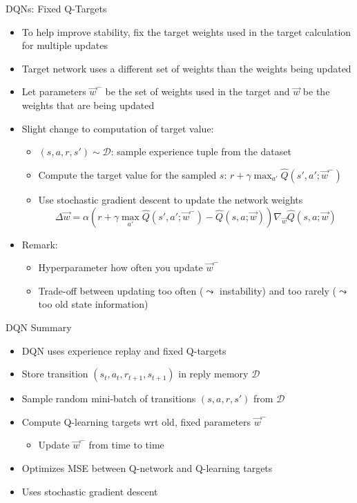 \begin{frame}[c]{DQNs: Fixed Q-Targets}
	
	\begin{itemize}
		\item To help improve stability, fix the \alert{target weights} used in the target calculation for multiple updates
		\item Target network uses a different set of weights than the weights being updated
		\item Let parameters $\vec{w}^-$ be the set of weights used in the target and $\vec{w}$ be the weights that are being updated
		\item Slight change to computation of target value:
		\begin{itemize}
			\item $(s,a,r,s')\sim \mathcal{D}$: sample experience tuple from the dataset
			\item Compute the target value for the sampled $s$: $r+\gamma \max_{a'} \hat{Q}(s',a';\vec{w}^-)$
			\item Use stochastic gradient descent to update the network weights
			$$\Delta \vec{w} = \alpha (r + \gamma \max_{a'} \hat{Q}(s',a';\vec{w}^-) - \hat{Q}(s,a;\vec{w})) \nabla_{\vec{w}}\hat{Q}(s,a;\vec{w})$$
		\end{itemize}
		\smallskip 
		\pause
		\item Remark:
		\begin{itemize}
			\item Hyperparameter how often you update $\vec{w}^-$
			\item Trade-off between updating too often ($\leadsto$ instability) and too rarely ($\leadsto$ too old state information)
		\end{itemize}
	\end{itemize}
	
\end{frame}
\begin{frame}[c]{DQN Summary}
	
	\begin{itemize}
		\item DQN uses experience replay and fixed Q-targets
		\item Store transition $(s_t, a_t, r_{t+1}, s_{t+1})$ in reply memory $\mathcal{D}$
		\item Sample random mini-batch of transitions $(s,a,r,s')$ from $\mathcal{D}$
		\item Compute Q-learning targets wrt old, fixed parameters $\vec{w}^-$
		\begin{itemize}
			\item Update $\vec{w}^-$ from time to time
		\end{itemize}
		\item Optimizes MSE between Q-network and Q-learning targets
		\item Uses stochastic gradient descent
	\end{itemize}
	
\end{frame}

